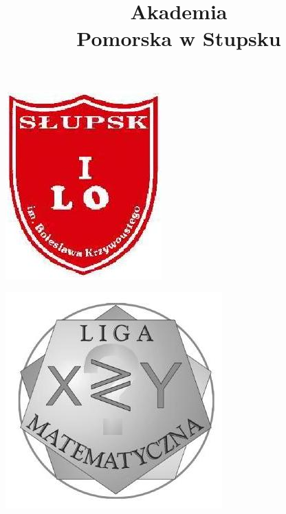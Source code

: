 \documentclass[10pt]{article}
\title{Akademia \\
 Pomorska w Stupsku }
\author{}
\date{}
\begin{document}
\maketitle
\begin{center}
\includegraphics[max width=\textwidth]{2024_11_21_57de5d02c67efebe8423g-1}
\end{center}

\begin{center}
\includegraphics[max width=\textwidth]{2024_11_21_57de5d02c67efebe8423g-1(1)}
\end{center}
\end{document}
